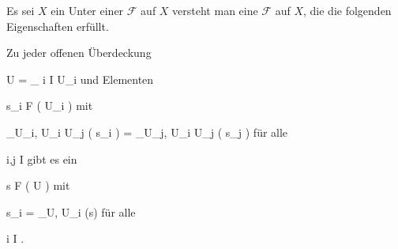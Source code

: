 Es sei $X$ ein
Unter einer
${ \mathcal F  }$ auf $X$ versteht man eine
${ \mathcal F  }$ auf $X$, die die folgenden Eigenschaften erfüllt.
 {Zu jeder offenen Überdeckung

\mavergleichskette
{\vergleichskette
{ U
}
{ = }{ \bigcup_{ i \in I} U_i
}
{  }{
}
{    }{
}
{   }{
}
}
{}{}{}
und Elementen

\mavergleichskette
{\vergleichskette
{s_i
}
{ \in }{ { \mathcal  F   }  \left(   U_i    \right)
}
{  }{
}
{    }{
}
{   }{
}
}
{}{}{}
mit

\mavergleichskette
{\vergleichskette
{  \rho_{U_i, U_i \cap U_j } \left(  s_i  \right)
}
{ = }{  \rho_{U_j, U_i \cap U_j } \left(  s_j  \right)
}
{  }{
}
{    }{
}
{   }{
}
}
{}{}{}
für alle

\mavergleichskette
{\vergleichskette
{i,j
}
{ \in }{ I
}
{  }{
}
{    }{
}
{   }{
}
}
{}{}{}
gibt es ein

\mavergleichskette
{\vergleichskette
{s
}
{ \in }{ { \mathcal  F   }  \left(   U   \right)
}
{  }{
}
{    }{
}
{   }{
}
}
{}{}{}
mit

\mavergleichskette
{\vergleichskette
{s_i
}
{ = }{ \rho_{U, U_i } (s)
}
{  }{
}
{    }{
}
{   }{
}
}
{}{}{}
für alle

\mavergleichskette
{\vergleichskette
{i
}
{ \in }{ I
}
{  }{
}
{    }{
}
{   }{
}
}
{}{}{.}
}







